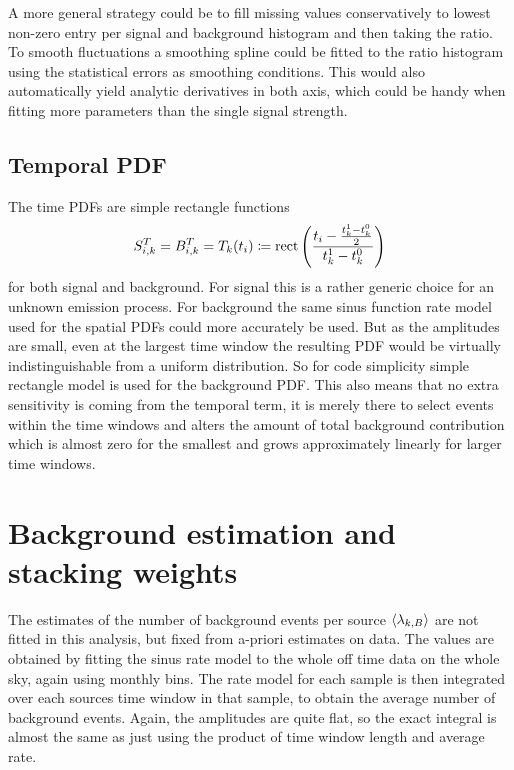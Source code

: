 A more general strategy could be to fill missing values conservatively to lowest non-zero entry per signal and background histogram and then taking the ratio.
To smooth fluctuations a smoothing spline could be fitted to the ratio histogram using the statistical errors as smoothing conditions.
This would also automatically yield analytic derivatives in both axis, which could be handy when fitting more parameters than the single signal strength.

\subsection*{Temporal PDF}
The time PDFs are simple rectangle functions
\begin{equation}
  S_{i,k}^T = B_{i,k}^T = T_k(t_i) \coloneqq
    \operatorname{rect}\left(\frac{t_i - \frac{t_k^1-t_k^0}{2}}
                              {t_k^1-t_k^0}\right)
\end{equation}
for both signal and background.
For signal this is a rather generic choice for an unknown emission process.
For background the same sinus function rate model used for the spatial PDFs could more accurately be used.
But as the amplitudes are small, even at the largest time window the resulting PDF would be virtually indistinguishable from a uniform distribution.
So for code simplicity simple rectangle model is used for the background PDF.
This also means that no extra sensitivity is coming from the temporal term, it is merely there to select events within the time windows and alters the amount of total background contribution which is almost zero for the smallest and grows approximately linearly for larger time windows.


\section{Background estimation and stacking weights}
The estimates of the number of background events per source $\Braket{\lambda_{k,B}}$ are not fitted in this analysis, but fixed from a-priori estimates on data.
The values are obtained by fitting the sinus rate model to the whole off time data on the whole sky, again using monthly bins.
The rate model for each sample is then integrated over each sources time window in that sample, to obtain the average number of background events.
Again, the amplitudes are quite flat, so the exact integral is almost the same as just using the product of time window length and average rate.

